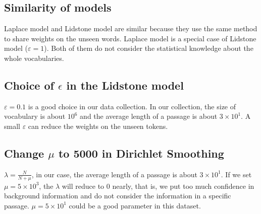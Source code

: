 \subsection{Similarity of models}
Laplace model and Lidstone model are similar because they use the same method to share weights on the unseen words. Laplace model is a special case of Lidstone model ($\varepsilon = 1$). Both of them do not consider the statistical knowledge about the whole vocabularies.

\subsection{Choice of $\epsilon$ in the Lidstone model}
$\varepsilon = 0.1$ is a good choice in our data collection. In our collection, the size of vocabulary is about $10^6$ and the average length of a passage is about $3\times10^1$. A small $\varepsilon$ can reduce the weights on the unseen tokens.

\subsection{Change $\mu$ to 5000 in Dirichlet Smoothing}
$\lambda = \frac{N}{N+\mu}$, in our case, the average length of a passage is about $3\times10^1$. If we set $\mu=5\times10^3$, the $\lambda$ will reduce to 0 nearly, that is, we put too much confidence in background information and do not consider the information in a specific passage. $\mu=5\times 10^1$ could be a good parameter in this dataset.


